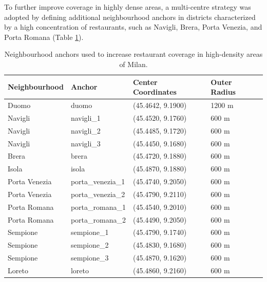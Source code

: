 To further improve coverage in highly dense areas, a multi-centre strategy was adopted by defining additional neighbourhood anchors in districts characterized by a high concentration of restaurants, such as Navigli, Brera, Porta Venezia, and Porta Romana (Table \ref{tab:google_anchors}).


\begin{table}[t]
\centering

\begin{tabular}{llll}
\toprule
\textbf{Neighbourhood} & \textbf{Anchor} & \textbf{Center Coordinates} & \textbf{Outer Radius} \\
\midrule
Duomo & duomo & (45.4642, 9.1900) & 1200 m \\

Navigli & navigli\_1 & (45.4520, 9.1760) & 600 m \\
Navigli & navigli\_2 & (45.4485, 9.1720) & 600 m \\
Navigli & navigli\_3 & (45.4450, 9.1680) & 600 m \\

Brera & brera & (45.4720, 9.1880) & 600 m \\

Isola & isola & (45.4870, 9.1880) & 600 m \\

Porta Venezia & porta\_venezia\_1 & (45.4740, 9.2050) & 600 m \\
Porta Venezia & porta\_venezia\_2 & (45.4790, 9.2110) & 600 m \\

Porta Romana & porta\_romana\_1 & (45.4540, 9.2010) & 600 m \\
Porta Romana & porta\_romana\_2 & (45.4490, 9.2050) & 600 m \\

Sempione & sempione\_1 & (45.4790, 9.1740) & 600 m \\
Sempione & sempione\_2 & (45.4830, 9.1680) & 600 m \\
Sempione & sempione\_3 & (45.4870, 9.1620) & 600 m \\

Loreto & loreto & (45.4860, 9.2160) & 600 m \\
\bottomrule
\end{tabular}

\captionsetup{font=small}
\caption{Neighbourhood anchors used to increase restaurant coverage in high-density areas of Milan.}
\label{tab:google_anchors}

\end{table}

